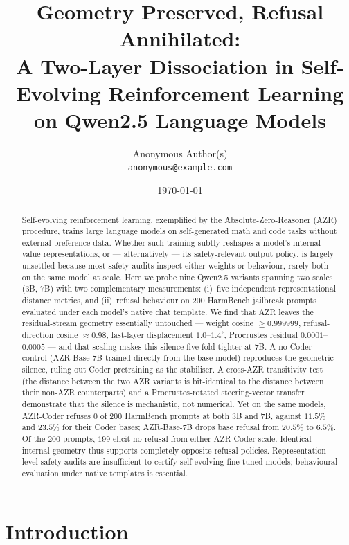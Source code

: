 \documentclass[11pt,a4paper]{article}
\title{\textbf{Geometry Preserved, Refusal Annihilated:\\
A Two-Layer Dissociation in Self-Evolving Reinforcement Learning\\
on Qwen2.5 Language Models}}
\author{%
  Anonymous Author(s)\\
  \texttt{anonymous@example.com}%
}
\date{\today}
\begin{document}
\maketitle

\begin{abstract}
\noindent
Self-evolving reinforcement learning, exemplified by the Absolute-Zero-Reasoner
(AZR) procedure, trains large language models on self-generated math and code
tasks without external preference data. Whether such training subtly reshapes
a model's internal value representations, or — alternatively — its
safety-relevant output policy, is largely unsettled because most safety audits
inspect either weights or behaviour, rarely both on the same model at scale.
Here we probe nine Qwen2.5 variants spanning two scales (3B, 7B) with two
complementary measurements: (i)~five independent representational distance
metrics, and (ii)~refusal behaviour on 200 HarmBench jailbreak prompts
evaluated under each model's native chat template. We find that AZR leaves
the residual-stream geometry essentially untouched — weight cosine
$\geq 0.999999$, refusal-direction cosine $\approx 0.98$, last-layer
displacement $1.0$--$1.4^{\circ}$, Procrustes residual $0.0001$--$0.0005$ —
and that scaling makes this silence five-fold tighter at 7B. A no-Coder
control (AZR-Base-7B trained directly from the base model) reproduces the
geometric silence, ruling out Coder pretraining as the stabiliser. A
cross-AZR transitivity test (the distance between the two AZR variants is
bit-identical to the distance between their non-AZR counterparts) and a
Procrustes-rotated steering-vector transfer demonstrate that the silence is
mechanistic, not numerical. Yet on the same models, AZR-Coder refuses
$0$ of $200$ HarmBench prompts at both 3B and 7B, against $11.5\%$ and
$23.5\%$ for their Coder bases; AZR-Base-7B drops base refusal from
$20.5\%$ to $6.5\%$. Of the $200$ prompts, $199$ elicit no refusal from
either AZR-Coder scale. Identical internal geometry thus supports completely
opposite refusal policies. Representation-level safety audits are
insufficient to certify self-evolving fine-tuned models; behavioural
evaluation under native templates is essential.
\end{abstract}

\section{Introduction}
\end{document}
